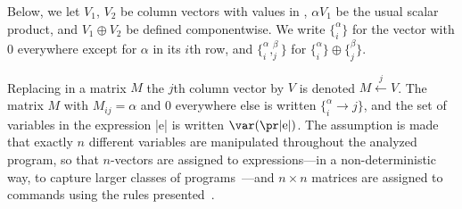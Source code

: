 
Below, we let \(V_1\), \(V_2\) be column vectors with values in \mwp, \(\alpha V_1\) be the usual scalar product, and \(V_1 \oplus V_2\) be defined componentwise.
We write \(\{_{i}^{\alpha}\}\) for the vector with \(0\) everywhere except for \(\alpha\) in its \(i\)th row, and \(\{_{i}^{\alpha} , _{j}^{\beta}\}\) for \(\{_{i}^{\alpha}\} \oplus \{_{j}^{\beta}\}\).

Replacing in a matrix \(M\) the \(j\)th column vector by \(V\) is denoted \(M \xleftarrow{j} V\).
The matrix \(M\) with \(M_{ij} = \alpha\) and \(0\) everywhere else is written \(\{_{i}^{\alpha} \rightarrow j\}\), and the set of variables in the expression \pr|e| is written \(\var(\text{\pr|e|})\).
The assumption is made that exactly \(n\) different variables are manipulated throughout the analyzed program, so that \(n\)-vectors are assigned to expressions---in a non-deterministic way, to capture larger classes of programs~\cite[Section 8]{jones2009}---and \(n \times n\) matrices are assigned to commands using the rules presented~\cite[Section 5]{jones2009}.



